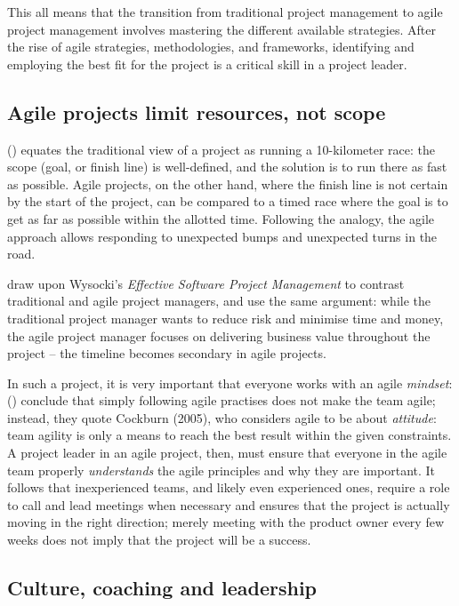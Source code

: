 This all means that the transition from traditional project management to agile project management involves mastering the different available strategies. After the rise of agile strategies, methodologies, and frameworks, identifying and employing the best fit for the project is a critical skill in a project leader.

\subsection{Agile projects limit resources, not scope}

\citeauthor{cohn:agile} (\citeyear{cohn:agile}) equates the traditional view of a project as running a 10-kilometer race: the scope (goal, or finish line) is well-defined, and the solution is to run there as fast as possible. Agile projects, on the other hand, where the finish line is not certain by the start of the project, can be compared to a timed race where the goal is to get as far as possible within the allotted time. Following the analogy, the agile approach allows responding to unexpected bumps and unexpected turns in the road.

\autocite{fernandez:agilevstraditional} draw upon Wysocki's \emph{Effective Software Project Management} to contrast traditional and agile project managers, and use the same argument: while the traditional project manager wants to reduce risk and minimise time and money, the agile project manager focuses on delivering business value throughout the project – the timeline becomes secondary in agile projects.

In such a project, it is very important that everyone works with an agile \emph{mindset}: \citeauthor{fernandez:agilevstraditional} (\citeyear{fernandez:agilevstraditional}) conclude that simply following agile practises does not make the team agile; instead, they quote Cockburn (2005), who considers agile to be about \emph{attitude}: team agility is only a means to reach the best result within the given constraints. A project leader in an agile project, then, must ensure that everyone in the agile team properly \emph{understands} the agile principles and why they are important. It follows that inexperienced teams, and likely even experienced ones, require a role to call and lead meetings when necessary and ensures that the project is actually moving in the right direction; merely meeting with the product owner every few weeks does not imply that the project will be a success.

\subsection{Culture, coaching and leadership}

